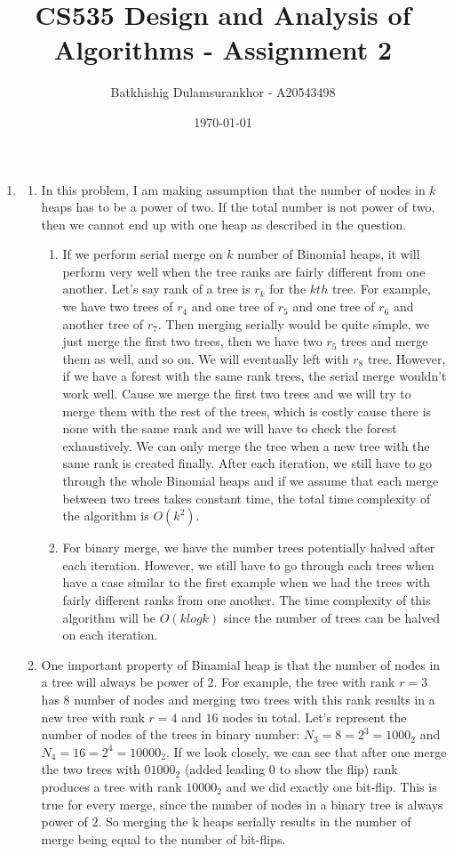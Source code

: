 \documentclass{article}
\title{CS535 Design and Analysis of Algorithms - Assignment 2}
\author{Batkhishig Dulamsurankhor - A20543498}
\date{\today} %
\begin{document}
\maketitle

\begin{enumerate}
  \item
  \begin{enumerate}
    \item In this problem, I am making assumption that the number of nodes in $k$ heaps has to be a power of two. 
    If the total number is not power of two, then we cannot end up with one heap as described in the question.
    \begin{enumerate}
      \item If we perform serial merge on $k$ number of Binomial heaps, it will perform very well when the tree ranks are fairly different from one another.
      Let's say rank of a tree is $r_k$ for the $kth$ tree. For example, we have two trees of $r_4$ and one tree of $r_5$ and one tree of $r_6$ and another tree of $r_7$.
      Then merging serially would be quite simple, we just merge the first two trees, then we have two $r_5$ trees and merge them as well, and so on. We will eventually left with $r_8$ tree.
      However, if we have a forest with the same rank trees, the serial merge wouldn't work well.
      Cause we merge the first two trees and we will try to merge them with the rest of the trees, which is costly cause there is none with the same rank and we will have to check the forest exhaustively.
      We can only merge the tree when a new tree with the same rank is created finally.
      After each iteration, we still have to go through the whole Binomial heaps and if we assume that each merge between two trees takes constant time, the total time complexity of the algorithm is $O(k^2)$.
      \item For binary merge, we have the number trees potentially halved after each iteration.
      However, we still have to go through each trees when have a case similar to the first example when we had the trees with fairly different ranks from one another.
      The time complexity of this algorithm will be $O(klogk)$ since the number of trees can be halved on each iteration.
    \end{enumerate}
    \item One important property of Binamial heap is that the number of nodes in a tree will always be power of $2$.
    For example, the tree with rank $r=3$ has $8$ number of nodes and merging two trees with this rank results in a new tree with rank $r=4$ and $16$ nodes in total.
    Let's represent the number of nodes of the trees in binary number: $N_3=8=2^3=1000_2$ and $N_4=16=2^4=10000_2$.
    If we look closely, we can see that after one merge the two trees with $01000_2$ (added leading 0 to show the flip) rank produces a tree with rank $10000_2$ and we did exactly one bit-flip.
    This is true for every merge, since the number of nodes in a binary tree is always power of $2$.
    So merging the k heaps serially results in the number of merge being equal to the number of bit-flips. 
  \end{enumerate}


\end{enumerate}
\end{document}
